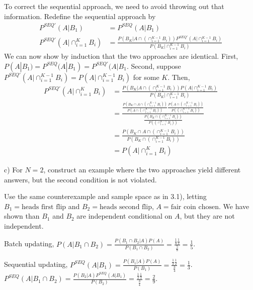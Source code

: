 \documentclass[12pt,english]{article}
\begin{document}
To correct the sequential approach, we need to avoid throwing out that information. Redefine the sequential approach by
\begin{align*}
P^{SEQ'}(A | B_{1}) & = P^{SEQ}(A | B_{1}) \\
P^{SEQ'}(A | \cap_{i = 1}^{K} B_{i}) & = \frac{P(B_{K} | A \cap (\cap_{i=1}^{K-1} B_{i})) P^{SEQ'}(A | \cap_{i = 1}^{K - 1} B_{i})}{P(B_{K} | \cap_{i=1}^{K-1} B_{i})}
\end{align*}
We can now show by induction that the two approaches are identical. First, $P(A|B_{1}) = P^{SEQ}(A|B_{1}) = P^{SEQ'}(A|B_{1}$. Second, suppose $P^{SEQ'}(A | \cap_{i = 1}^{K-1} B_{i}) = P(A | \cap_{i = 1}^{K-1} B_{i})$ for some $K$. Then,
\begin{align*}
P^{SEQ'}(A | \cap_{i = 1}^{K} B_{i}) & = \frac{P(B_{K} | A \cap (\cap_{i=1}^{K-1} B_{i})) P(A | \cap_{i = 1}^{K - 1} B_{i})}{P(B_{K} | \cap_{i=1}^{K-1} B_{i})} \\
& = \frac{\frac{P(B_{K} \cap A \cap (\cap_{i=1}^{K-1} B_{i}))}{P(A \cap (\cap_{i=1}^{K-1} B_{i}))} \frac{P(A \cap (\cap_{i=1}^{K-1} B_{i}))}{P((\cap_{i=1}^{K-1} B_{i}))}}{\frac{P(B_{K} \cap (\cap_{i=1}^{K-1} B_{i}))}{P((\cap_{i=1}^{K-1} B_{i}))}} \\
& = \frac{P(B_{K} \cap A \cap (\cap_{i=1}^{K-1} B_{i}))}{P(B_{K} \cap (\cap_{i=1}^{K-1} B_{i}))} \\
& = P(A | \cap_{i=1}^{K} B_{i})
\end{align*}

\vspace{1em}

c) For $N = 2$, construct an example where the two approaches yield different answers, but the second condition is not violated.

\vspace{1em}

Use the same counterexample and sample space as in 3.1), letting $B_{1} = \text{heads first flip}$ and $B_{2} = \text{heads second flip}$, $A = \text{fair coin chosen}$. We have shown than $B_{1}$ and $B_{2}$ are independent conditional on $A$, but they are not independent.

Batch updating, $P(A | B_{1} \cap B_{2}) = \frac{P(B_{1} \cap B_{2} | A) P(A)}{P(B_{1} \cap B_{2})} = \frac{\frac{1}{4} \frac{1}{2}}{\frac{5}{8}} = \frac{1}{5}$.

Sequential updating, $P^{SEQ}(A | B_{1}) = \frac{P(B_{1} | A) P(A)}{P(B_{1})} = \frac{\frac{1}{2} \frac{1}{2}}{\frac{3}{4}} = \frac{1}{3}$. $P^{SEQ}(A | B_{1} \cap B_{2}) = \frac{P(B_{2} | A) P^{SEQ}(A | B_{1})}{P(B_{2})} = \frac{\frac{1}{2} \frac{1}{3}}{\frac{3}{4}} = \frac{2}{9}$.
\end{document}
